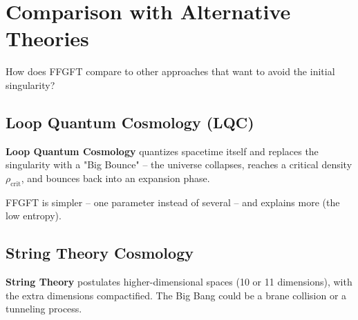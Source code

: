 	\section{Comparison with Alternative Theories}
	
	How does FFGFT compare to other approaches that want to avoid the initial singularity?
	
	\subsection{Loop Quantum Cosmology (LQC)}
	
	\textbf{Loop Quantum Cosmology} quantizes spacetime itself and replaces the singularity with a "Big Bounce" -- the universe collapses, reaches a critical density $\rho_{\text{crit}}$, and bounces back into an expansion phase.
	
	\begin{center}
		\small
	\end{center}
	
	FFGFT is simpler -- one parameter instead of several -- and explains more (the low entropy).
	
	\subsection{String Theory Cosmology}
	
	\textbf{String Theory} postulates higher-dimensional spaces (10 or 11 dimensions), with the extra dimensions compactified. The Big Bang could be a brane collision or a tunneling process.
	
